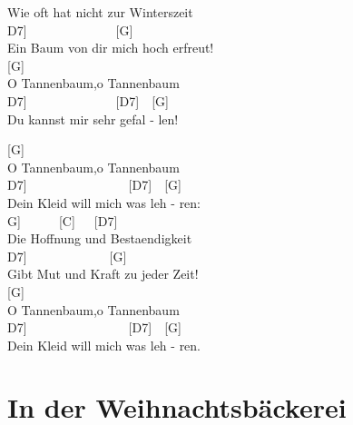 \documentclass[
  letterpaper,
  twoside=false]{scrbook}
\begin{document}
Wie oft hat nicht zur Winterszeit\\
\hspace*{0.333em}\hspace*{0.333em}\hspace*{0.333em}{[}D7{]}~~~~~~~~~~~~~~{[}G{]}~~~~~\\
Ein Baum von dir mich hoch erfreut!\\
{[}G{]}~~\\
O Tannenbaum,o Tannenbaum\\
\hspace*{0.333em}\hspace*{0.333em}{[}D7{]}~~~~~~~~~~~~~~{[}D7{]}~~{[}G{]}~~~~~\\
Du kannst mir sehr gefal - len!

{[}G{]}~~~~\\
O Tannenbaum,o Tannenbaum\\
\hspace*{0.333em}\hspace*{0.333em}\hspace*{0.333em}\hspace*{0.333em}{[}D7{]}~~~~~~~~~~~~~~~~{[}D7{]}~~{[}G{]}~~~~~\\
Dein Kleid will mich was leh - ren:\\
\hspace*{0.333em}\hspace*{0.333em}\hspace*{0.333em}{[}G{]}~~~~~~{[}C{]}~~~{[}D7{]}~~\\
Die Hoffnung und Bestaendigkeit\\
\hspace*{0.333em}\hspace*{0.333em}\hspace*{0.333em}\hspace*{0.333em}{[}D7{]}~~~~~~~~~~~~~{[}G{]}~~\\
Gibt Mut und Kraft zu jeder Zeit!\\
{[}G{]}~~\\
O Tannenbaum,o Tannenbaum\\
\hspace*{0.333em}\hspace*{0.333em}\hspace*{0.333em}\hspace*{0.333em}{[}D7{]}~~~~~~~~~~~~~~~~{[}D7{]}~~{[}G{]}~~~~~\\
Dein Kleid will mich was leh - ren.

\hypertarget{in-der-weihnachtsbuxe4ckerei}{%
\chapter{In der Weihnachtsbäckerei}\label{in-der-weihnachtsbuxe4ckerei}}
\end{document}
